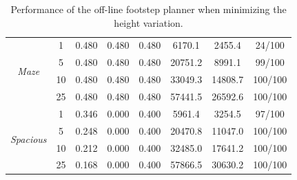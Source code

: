 \begin{table}
\begin{tabular}{*{8}{c}}
        \hline                                                                      
        \multirow{4}{*}{\textit{Maze}} & 1 & 0.480 & 0.480 & 0.480 & 6170.1 & 2455.4 & 24/100 \\
         & 5 & 0.480 & 0.480 & 0.480 & 20751.2 & 8991.1 & 99/100 \\
         & 10 & 0.480 & 0.480 & 0.480 & 33049.3 & 14808.7 & 100/100 \\
         & 25 & 0.480 & 0.480 & 0.480 & 57441.5 & 26592.6 & 100/100 \\ 
    
        \hline   
        \multirow{4}{*}{\textit{Spacious}} & 1 & 0.346 & 0.000 & 0.400 & 5961.4 & 3254.5 & 97/100 \\
         & 5 & 0.248 & 0.000 & 0.400 & 20470.8 & 11047.0 & 100/100 \\
         & 10 & 0.212 & 0.000 & 0.400 & 32485.0 & 17641.2 & 100/100 \\
         & 25 & 0.168 & 0.000 & 0.400 & 57866.5 & 30630.2 & 100/100 \\       
    
        \end{tabular}
    \caption{Performance of the off-line footstep planner when minimizing the height variation.}
    \label{tab:benchmark:off-line:height}
\end{table}

